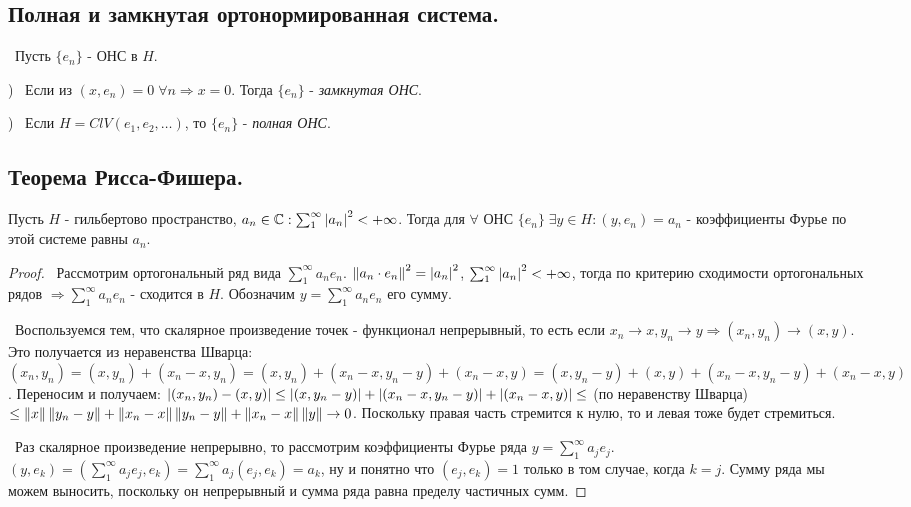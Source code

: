 \subsection*{Полная и замкнутая ортонормированная система.}

\noindent \textasteriskcentered~Пусть $\{ e_n \}$ - ОНС в $H$.

)~ Если из $(x, e_n) = 0 \; \forall n \Rightarrow x = 0$. Тогда $\{ e_n\}$ - \textit{замкнутая ОНС}.

)~ Если $H = Cl V(e_1, e_2, \dots)$, то $\{ e_n\}$ - \textit{полная ОНС}. 


\subsection*{Теорема Рисса-Фишера.}

\begin{theorem*}
   Пусть $H$ - гильбертово пространство, $a_n \in \mathbb{C} : \sum_1^\infty \left\lvert a_n\right\rvert^2 < + \infty$. Тогда для $\forall$ ОНС $\{ e_n \} \; \exists y \in H : (y, e_n) = a_n$ -
   коэффициенты Фурье по этой системе равны $a_n$.
\end{theorem*}

\begin{proof}
\smallskip
\par\noindent \textbullet~Рассмотрим ортогональный ряд вида $\sum_1^\infty a_n e_n$. $\left\lVert a_n \cdot e_n\right\rVert^2 = \left\lvert a_n\right\rvert^2$, $\sum_1^\infty \left\lvert a_n\right\rvert^2 < + \infty$,
тогда по критерию сходимости ортогональных рядов $\Rightarrow \sum_1^\infty a_n e_n$ - сходится в $H$. Обозначим $y = \sum_1^\infty a_n e_n$ его сумму. 

\smallskip
\noindent \textbullet~Воспользуемся тем, что скалярное произведение точек - функционал непрерывный, то есть если $x_n \to x, y_n \to y \Rightarrow (x_n, y_n) \to (x, y)$.
Это получается из неравенства Шварца: $(x_n, y_n) = (x, y_n) + (x_n - x, y_n) = (x, y_n) + (x_n - x, y_n - y) + (x_n - x, y) = (x, y_n - y) + (x, y) + (x_n - x, y_n -y) + 
(x_n - x, y)$. Переносим и получаем: $\left\lvert(x_n, y_n) - (x, y)\right\rvert \le \left\lvert(x, y_n - y)\right\rvert + \left\lvert(x_n - x, y_n - y)\right\rvert + \left\lvert(x_n - x, y)\right\rvert \le $ (по неравенству Шварца) $\le
\left\lVert x\right\rVert \left\lVert y_n - y\right\rVert + \left\lVert x_n - x\right\rVert \left\lVert y_n - y\right\rVert + \left\lVert x_n - x\right\rVert \left\lVert y\right\rVert \to 0$. Поскольку правая часть стремится к нулю, то и левая тоже будет стремиться.

\smallskip
\noindent \textbullet~Раз скалярное произведение непрерывно, то рассмотрим коэффициенты Фурье ряда $y = \sum_1^\infty a_j e_j$. $(y, e_k) = (\sum_1^\infty a_j e_j, 
e_k) = \sum_1^\infty a_j (e_j, e_k) = a_k$, ну и понятно что $(e_j, e_k) = 1$ только в том случае, когда $k = j$. Сумму ряда мы можем выносить, поскольку 
он непрерывный и сумма ряда равна пределу частичных сумм. 
\end{proof}

